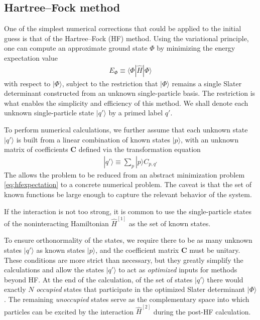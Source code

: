 \subsection{Hartree--Fock method}
\label{subsec:HartreeFockmethod}

One of the simplest numerical corrections that could be applied to the initial guess is that of the Hartree--Fock (HF) method.  Using the variational principle, one can compute an approximate ground state $\Phi$ by minimizing the energy expectation value
\begin{align} \label{eq:hfexpectation}
  E_{\Phi} \equiv \langle \Phi | \hat H | \Phi \rangle
\end{align}
with respect to $|\Phi\rangle$, subject to the restriction that $|\Phi\rangle$ remains a single Slater determinant constructed from an unknown single-particle basis.  The restriction is what enables the simplicity and efficiency of this method.  We shall denote each unknown single-particle state $|q'\rangle$ by a primed label $q'$.

To perform numerical calculations, we further assume that each unknown state $|q'\rangle$ is built from a linear combination of known states $|p\rangle$, with an unknown matrix of coefficients $\bm C$ defined via the transformation equation
\begin{align*}
  |q'\rangle \equiv \sum_p |p\rangle C_{p, q'}
\end{align*}
The allows the problem to be reduced from an abstract minimization problem \eqref{eq:hfexpectation} to a concrete numerical problem.  The caveat is that the set of known functions be large enough to capture the relevant behavior of the system.

If the interaction is not too strong, it is common to use the single-particle states of the noninteracting Hamiltonian $\hat{H}^{[1]}$ as the set of known states.

To ensure orthonormality of the states, we require there to be as many unknown states $|q'\rangle$ as known states $|p\rangle$, and the coefficient matrix $\bm C$ must be unitary.  These conditions are more strict than necessary, but they greatly simplify the calculations and allow the states $|q'\rangle$ to act as \textit{optimized} inputs for methods beyond HF.  At the end of the calculation, of the set of states $|q'\rangle$ there would exactly $N$ \textit{occupied} states that participate in the optimized Slater determinant $|\Phi\rangle$.  The remaining \textit{unoccupied} states serve as the complementary space into which particles can be excited by the interaction $\hat{H}^{[2]}$ during the post-HF calculation.

